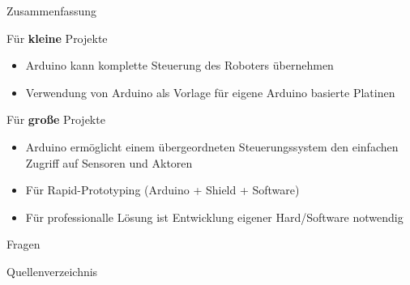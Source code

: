 \documentclass{beamer}
\begin{document}
\begin{frame}{Zusammenfassung}
\begin{large}F\"ur \textbf{kleine} Projekte\end{large}
\begin{itemize}
	\item Arduino kann komplette Steuerung des Roboters \"ubernehmen
	\item Verwendung von Arduino als Vorlage f\"ur eigene Arduino basierte Platinen
\end{itemize}
\vspace{20px}
\begin{large}F\"ur \textbf{gro\ss{}e} Projekte\end{large}
\begin{itemize}
	\item Arduino erm\"oglicht einem \"ubergeordneten Steuerungssystem den einfachen Zugriff auf Sensoren und Aktoren
	\item F\"ur Rapid-Prototyping (Arduino + Shield + Software)
	\item F\"ur professionalle L\"osung ist Entwicklung eigener Hard/Software notwendig
\end{itemize}
\end{frame}
\begin{frame}
	\Huge{\centerline{Fragen}}
\end{frame}
\begin{frame}[allowframebreaks]{Quellenverzeichnis}
\scriptsize{}
\end{frame}
\end{document}

